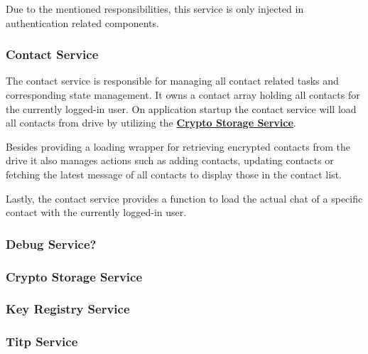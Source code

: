 
Due to the mentioned responsibilities, this service is only injected in authentication related components.

\subsubsection{Contact Service}\label{subsubsec:contact-service}

The contact service is responsible for managing all contact related tasks and corresponding state management.
It owns a contact array holding all contacts for the currently logged-in user.
On application startup the contact service will load all contacts from drive by utilizing the
\textbf{\hyperref[subsubsec:crypto-storage-service]{Crypto Storage Service}}.

Besides providing a loading wrapper for retrieving encrypted contacts from the drive it also manages actions such as
adding contacts, updating contacts or fetching the latest message of all contacts to display those in the contact list.

Lastly, the contact service provides a function to load the actual chat of a specific contact with the currently
logged-in user.


\subsubsection{Debug Service?}

\subsubsection{Crypto Storage Service}

\subsubsection{Key Registry Service}

\subsubsection{Titp Service}

